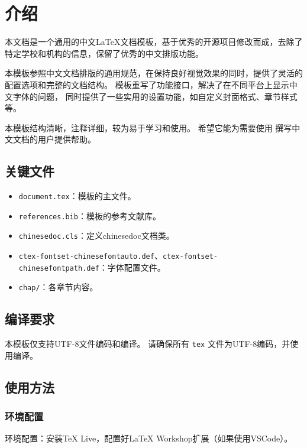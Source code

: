 \chapter{介绍}
\label{chap:intro}

\def\GitHubLink{\href{https://github.com/example/chinese-template}{GitHub仓库链接（示例）}}

本文档是一个通用的中文LaTeX文档模板，基于优秀的开源项目修改而成，去除了特定学校和机构的信息，保留了优秀的中文排版功能。

本模板参照中文文档排版的通用规范，在保持良好视觉效果的同时，提供了灵活的配置选项和完整的文档结构。
模板重写了功能接口，解决了在不同平台上显示中文字体的问题，
同时提供了一些实用的设置功能，如自定义封面格式、章节样式等。

本模板结构清晰，注释详细，较为易于学习和使用。
希望它能为需要使用  撰写中文文档的用户提供帮助。

\section{关键文件}
\begin{itemize}
    \item \verb|document.tex|：模板的主文件。
    \item \verb|references.bib|：模板的参考文献库。
    \item \verb|chinesedoc.cls|：定义chinesedoc文档类。
    \item \verb|ctex-fontset-chinesefontauto.def|、\verb|ctex-fontset-chinesefontpath.def|：字体配置文件。
    \item \verb|chap/|：各章节内容。
\end{itemize}

\section{编译要求}
本模板仅支持UTF-8文件编码和编译。
请确保所有 \verb|tex| 文件为UTF-8编码，并使用编译。

\section{使用方法}

\subsection{环境配置}
环境配置：安装TeX Live，配置好LaTeX Workshop扩展（如果使用VSCode）。

